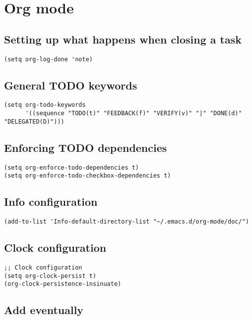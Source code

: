 \documentclass[11pt]{article}
\begin{document}
\section{Org mode}
\label{sec-24}
\subsection{Setting up what happens when closing a task}
\label{sec-24.1}

\begin{verbatim}
(setq org-log-done 'note)
\end{verbatim}
\subsection{General TODO keywords}
\label{sec-24.2}

\begin{verbatim}
(setq org-todo-keywords
      '((sequence "TODO(t)" "FEEDBACK(f)" "VERIFY(v)" "|" "DONE(d)" "DELEGATED(D)")))
\end{verbatim}
\subsection{Enforcing TODO dependencies}
\label{sec-24.3}

\begin{verbatim}
(setq org-enforce-todo-dependencies t)
(setq org-enforce-todo-checkbox-dependencies t)
\end{verbatim}

   
\subsection{Info configuration}
\label{sec-24.4}

\begin{verbatim}
(add-to-list 'Info-default-directory-list "~/.emacs.d/org-mode/doc/")
\end{verbatim}
\subsection{Clock configuration}
\label{sec-24.5}

\begin{verbatim}
;; Clock configuration
(setq org-clock-persist t)
(org-clock-persistence-insinuate)
\end{verbatim}
\subsection{Add eventually}
\label{sec-24.6}
\end{document}
